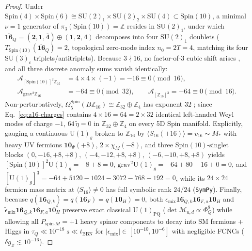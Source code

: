 \documentclass[11pt,a4paper]{article}
\begin{document}
\begin{proof}
Under $\mathrm{Spin}(4)\times\mathrm{Spin}(6) \cong \mathrm{SU}(2)_1\times\mathrm{SU}(2)_2\times\mathrm{SU}(4) \subset \mathrm{Spin}(10)$, a minimal $\nu = 1$ generator of $\pi_3(\mathrm{Spin}(10)) = \mathbb{Z}$ resides in $\mathrm{SU}(2)_1$, under which $\overline{\mathbf{16}}_Q = (\mathbf{2},\mathbf{1},\overline{\mathbf{4}})\oplus(\mathbf{1},\mathbf{2},\mathbf{4})$ decomposes into four $\mathrm{SU}(2)_1$ doublets ($T_{\mathrm{Spin}(10)}(\overline{\mathbf{16}}_Q) = 2$, topological zero-mode index $n_0 = 2 T = 4$, matching its four $\mathrm{SU}(3)_c$ triplets/antitriplets). Because $3 \nmid 16$, no factor-of-$3$ cubic shift arises \cite{IbanezRoss1991}, and all three discrete anomaly sums vanish identically:
\begin{equation}
\begin{aligned}
\mathcal{A}_{[\mathrm{Spin}(10)]^2\mathbb{Z}_{16}} &= 4 \times 4 \times (-1) = -16 \equiv 0 \pmod{16}, \\
\mathcal{A}_{\mathrm{grav}^2\mathbb{Z}_{16}} &= -64 \equiv 0 \pmod{32}, \qquad
\mathcal{A}_{[\mathbb{Z}_{16}]^3} = -64 \equiv 0 \pmod{16}.
\end{aligned}
\label{eq:z16-anomalies}
\end{equation}
Non-perturbatively, $\Omega_5^{\mathrm{Spin}}(B\mathbb{Z}_{16}) \cong \mathbb{Z}_{32}\oplus\mathbb{Z}_4$ has exponent $32$ \cite{Hsieh2018,GarciaEtxebarriaMontero2019}; since Eq.~\eqref{eq:z16-charges} contains $4 \times 16 = 64 = 2 \times 32$ identical left-handed Weyl modes of charge $-1$, $64\,\tilde{\eta} = 0$ in $\mathbb{Z}_{32}\oplus\mathbb{Z}_4$ on every 5D Spin manifold. Explicitly, gauging a continuous $\mathrm{U}(1)_g$ broken to $\mathbb{Z}_{16}$ by $\langle S_{16}(+16)\rangle = v_{16} \sim M_*$ with heavy UV fermions $\mathbf{10}_\Psi(+8)$, $2\times\chi_M(-8)$, and three $\mathrm{Spin}(10)$-singlet blocks $(0,-16,+8,+8)$, $(-4,-12,+8,+8)$, $(-6,-10,+8,+8)$ yields $[\mathrm{Spin}(10)]^2\mathrm{U}(1)_g = -8 + 8 = 0$, $\mathrm{grav}^2\mathrm{U}(1)_g = -64 + 80 - 16 + 0 = 0$, and $[\mathrm{U}(1)_g]^3 = -64 + 5120 - 1024 - 3072 - 768 - 192 = 0$, while its $24\times 24$ fermion mass matrix at $\langle S_{16}\rangle \neq 0$ has full symbolic rank $24/24$ (\texttt{SymPy}). Finally, because $q(\mathbf{16}_{Q,k}) = q(\mathbf{16}_F) = q(\mathbf{10}_H) = 0$, both $\epsilon_{\mathrm{mix}}\mathbf{16}_{Q,k}\mathbf{16}_{F,a}\mathbf{10}_H$ and $\tilde{\epsilon}_{\mathrm{mix}}\mathbf{16}_{Q,k}\mathbf{16}_{F,a}\mathbf{10}_H^*$ preserve exact classical $\mathrm{U}(1)_{\mathrm{PQ}}$ ($\det\mathcal{M}_{u,d} \propto \Phi_Q^8$) while allowing all $P_{\mathrm{spin}\text{-}M} = +1$ heavy spinor components to decay into SM fermions + Higgs in $\tau_Q \ll 10^{-18}\;\mathrm{s} \ll t_{\mathrm{BBN}}$ for $|\epsilon_{\mathrm{mix}}| \in [10^{-10}, 10^{-6}]$ with negligible FCNCs ($\delta g_Z \lesssim 10^{-16}$). \qedhere
\end{proof}
\end{document}
